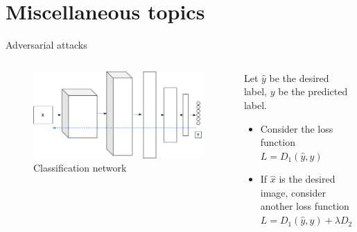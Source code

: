\section{Miscellaneous topics}

\begin{frame}{Adversarial attacks}
\begin{columns}
	\begin{column}{.5\textwidth}
		\begin{figure}
			\includegraphics[width=.8\textwidth]{figures/adverserial-net}
			\caption*{Classification network}
		\end{figure}
	\end{column}
	\begin{column}{.5\textwidth}
		Let $\hat{y}$ be the desired label,  $y$ be the predicted label.
		\begin{itemize}
			\item  Consider  the loss function $L=D_1(\hat{y},y)$ 
			\item  If $\hat{x}$ is the desired image, consider another loss function 
				$L=D_1(\hat{y},y) + \lambda D_2(\hat{x},x) $
		\end{itemize}
	\end{column}
\end{columns}
\end{frame}
